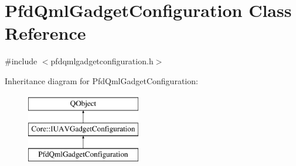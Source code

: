 \hypertarget{class_pfd_qml_gadget_configuration}{\section{Pfd\-Qml\-Gadget\-Configuration Class Reference}
\label{class_pfd_qml_gadget_configuration}
}


{\ttfamily \#include $<$pfdqmlgadgetconfiguration.\-h$>$}

Inheritance diagram for Pfd\-Qml\-Gadget\-Configuration\-:\begin{figure}[H]
\begin{center}
\leavevmode
\includegraphics[height=3.000000cm]{class_pfd_qml_gadget_configuration}
\end{center}
\end{figure}

